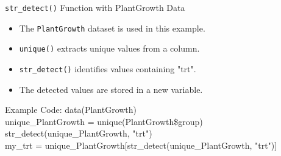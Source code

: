 \documentclass{beamer}
\begin{document}
\begin{frame}{\texttt{str\_detect()} Function with PlantGrowth Data}
    \begin{itemize}
        \item The \texttt{PlantGrowth} dataset is used in this example.
        \item \texttt{unique()} extracts unique values from a column.
        \item \texttt{str\_detect()} identifies values containing "trt".
        \item The detected values are stored in a new variable.
    \end{itemize}

    
    \begin{block}{Example Code:}
     \quad data(PlantGrowth)\\
\quad unique\_PlantGrowth = unique(PlantGrowth\$group)\\
\quad str\_detect(unique\_PlantGrowth, "trt")\\
\quad my\_trt = unique\_PlantGrowth[str\_detect(unique\_PlantGrowth, "trt")] 
    \end{block}


\end{frame}
\end{document}
